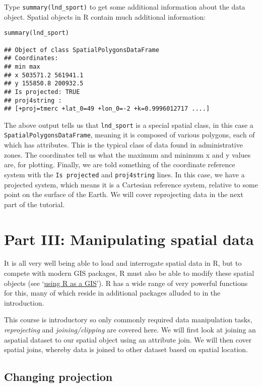 \documentclass[]{article}
\begin{document}
Type \texttt{summary(lnd\_sport)} to get some additional information
about the data object. Spatial objects in R contain much additional
information:

\begin{verbatim}
summary(lnd_sport)

## Object of class SpatialPolygonsDataFrame
## Coordinates:
## min max
## x 503571.2 561941.1
## y 155850.8 200932.5
## Is projected: TRUE
## proj4string :
## [+proj=tmerc +lat_0=49 +lon_0=-2 +k=0.9996012717 ....]
\end{verbatim}

The above output tells us that \texttt{lnd\_sport} is a special spatial
class, in this case a \texttt{SpatialPolygonsDataFrame}, meaning it is
composed of various polygons, each of which has attributes. This is the
typical class of data found in administrative zones. The coordinates
tell us what the maximum and minimum x and y values are, for plotting.
Finally, we are told something of the coordinate reference system with
the \texttt{Is projected} and \texttt{proj4string} lines. In this case,
we have a projected system, which means it is a Cartesian reference
system, relative to some point on the surface of the Earth. We will
cover reprojecting data in the next part of the tutorial.

\section{Part III: Manipulating spatial
data}\label{part-iii-manipulating-spatial-data}

It is all very well being able to load and interrogate spatial data in
R, but to compete with modern GIS packages, R must also be able to
modify these spatial objects (see
`\href{https://github.com/Pakillo/R-GIS-tutorial}{using R as a GIS}'). R
has a wide range of very powerful functions for this, many of which
reside in additional packages alluded to in the introduction.

This course is introductory so only commonly required data manipulation
tasks, \emph{reprojecting} and \emph{joining/clipping} are covered here.
We will first look at joining an aspatial dataset to our spatial object
using an attribute join. We will then cover spatial joins, whereby data
is joined to other dataset based on spatial location.

\subsection{Changing projection}\label{changing-projection}
\end{document}
